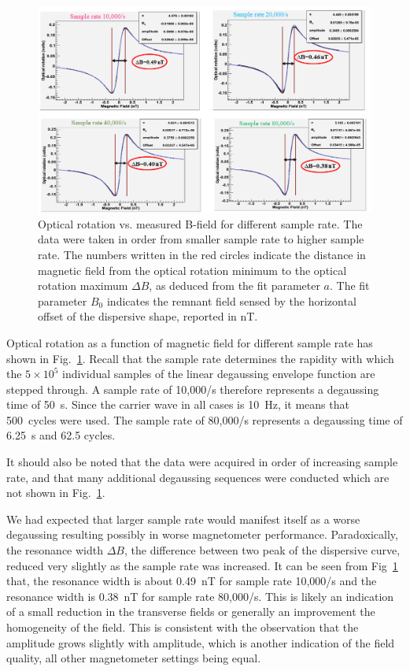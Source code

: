 \begin{figure}%
  \centering\includegraphics[width=\linewidth]{figures/sample_rate}
  \caption{ Optical rotation vs. measured B-field for different sample
    rate.  The data were taken in order from smaller sample rate to
    higher sample rate.  The numbers written in the red circles
    indicate the distance in magnetic field from the optical rotation
    minimum to the optical rotation maximum $\Delta B$, as deduced
    from the fit parameter $a$.  The fit parameter $B_0$ indicates the
    remnant field sensed by the horizontal offset of the dispersive
    shape, reported in nT.\label{fig:different-sample-rate}}
\end{figure}

Optical rotation as a function of magnetic field for different sample
rate has shown in Fig.~\ref{fig:different-sample-rate}.  Recall that
the sample rate determines the rapidity with which the $5\times 10^5$
individual samples of the linear degaussing envelope function are
stepped through.  A sample rate of 10,000/s therefore represents a
degaussing time of 50~s.  Since the carrier wave in all cases is
10~Hz, it means that 500~cycles were used.  The sample rate of
80,000/s represents a degaussing time of 6.25~s and 62.5 cycles.

It should also be noted that the data were acquired in order of
increasing sample rate, and that many additional degaussing sequences
were conducted which are not shown in
Fig.~\ref{fig:different-sample-rate}.

We had expected that larger sample rate would manifest itself as a
worse degaussing resulting possibly in worse magnetometer performance.
Paradoxically, the resonance width $\Delta B$, the difference between
two peak of the dispersive curve, reduced very slightly as the sample
rate was increased.  It can be seen from
Fig~\ref{fig:different-sample-rate} that, the resonance width is about
0.49~nT for sample rate 10,000/s and the resonance width is 0.38~nT
for sample rate 80,000/s.  This is likely an indication of a small
reduction in the transverse fields or generally an improvement the
homogeneity of the field.  This is consistent with the observation
that the amplitude grows slightly with amplitude, which is another
indication of the field quality, all other magnetometer settings being
equal.

